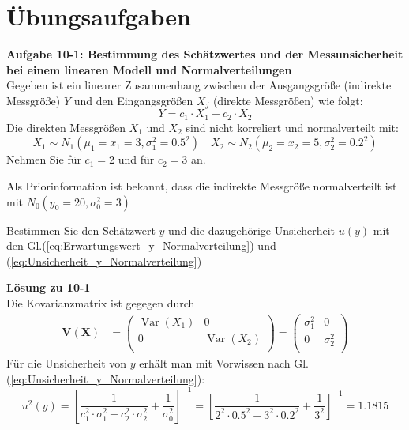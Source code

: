 \newpage
\section{Übungsaufgaben}
\textbf{Aufgabe 10-1: Bestimmung des Schätzwertes und der Messunsicherheit bei
einem linearen Modell und Normalverteilungen}\\
Gegeben ist ein linearer Zusammenhang zwischen der Ausgangsgröße (indirekte
Messgröße) $Y$ und den Eingangsgrößen $X_j$ (direkte Messgrößen) wie folgt:
\[
Y = c_1 \cdot X_1 + c_2 \cdot X_2
\]
Die direkten Messgrößen $X_1$ und $X_2$ sind nicht korreliert und 
normalverteilt mit: 
\[
X_1 \sim N_{1}(\mu_1 =x_1=3,\sigma_1^2= 0.5^2 ) 
\quad X_2 \sim N_{2}(\mu_2=x_2= 5,\sigma_2^2=0.2^2 )
\]
Nehmen Sie für $c_1 = 2$ und für $c_2 = 3$ an. 

Als Priorinformation ist bekannt, dass die indirekte Messgröße
normalverteilt ist mit \newline  $N_0(y_0=20,\sigma_0^2=3)$

Bestimmen Sie den Schätzwert $y$ und die dazugehörige Unsicherheit 
$u(y)$ mit den Gl.(\ref{eq:Erwartungswert_y_Normalverteilung}) und 
(\ref{eq:Unsicherheit_y_Normalverteilung})

\textbf{Lösung zu 10-1} \\
Die Kovarianzmatrix ist gegegen durch 
\begin{align}
\boldsymbol{V(X)} &= 
\begin{pmatrix}
\operatorname{Var}(X_1) & 0 \\
0 & \operatorname{Var}(X_2)  \\
\end{pmatrix}
= 
\begin{pmatrix}
\sigma_1^2 & 0 \\
0 & \sigma_2^2 \\
\end{pmatrix}
\end{align}
Für die Unsicherheit von $y$ erhält man mit Vorwissen nach Gl.	(\ref{eq:Unsicherheit_y_Normalverteilung}):
\[
u^2(y) = \left[ \frac{1}{c_1^2\cdot \sigma_1^2 + c_2^2\cdot \sigma_2^2} 
+ \frac{1}{\sigma_0^2} \right]^{-1}
 = \left[ \frac{1}{2^2\cdot 0.5^2 + 3^2\cdot 0.2^2} 
+ \frac{1}{3^2} \right]^{-1} = 1.1815
\]

